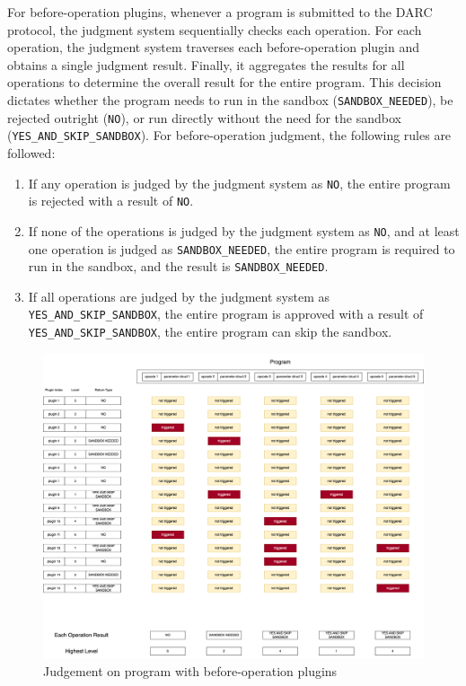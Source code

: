 \documentclass[main.tex]{subfiles}
\begin{document}
For before-operation plugins, whenever a program is submitted to the DARC protocol, the judgment system sequentially checks each operation. For each operation, the judgment system traverses each before-operation plugin and obtains a single judgment result. Finally, it aggregates the results for all operations to determine the overall result for the entire program. This decision dictates whether the program needs to run in the sandbox (\texttt{SANDBOX\_NEEDED}), be rejected outright (\texttt{NO}), or run directly without the need for the sandbox (\texttt{YES\_AND\_SKIP\_SANDBOX}). For before-operation judgment, the following rules are followed:

\begin{enumerate}
    \item If any operation is judged by the judgment system as \texttt{NO}, the entire program is rejected with a result of \texttt{NO}.
    \item If none of the operations is judged by the judgment system as \texttt{NO}, and at least one operation is judged as \texttt{SANDBOX\_NEEDED}, the entire program is required to run in the sandbox, and the result is \texttt{SANDBOX\_NEEDED}.
    \item If all operations are judged by the judgment system as \texttt{YES\_AND\_SKIP\_SANDBOX}, the entire program is approved with a result of \texttt{YES\_AND\_SKIP\_SANDBOX}, the entire program can skip the sandbox.
\end{enumerate}




\begin{figure}
\centering
\includegraphics[width=1\linewidth]{judgement_plugin_levels_before_ops.drawio.png}
\caption{\label{fig:judgement-before-op}Judgement on program with before-operation plugins}
\end{figure}
\end{document}
